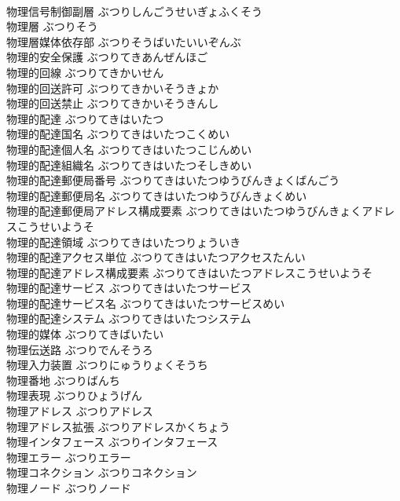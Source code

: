 \documentclass[8pt]{extreport}
\begin{document}
\begin{CJK}{UTF8}{min}
\\	物理信号制御副層	ぶつりしんごうせいぎょふくそう	
\\	物理層	ぶつりそう	
\\	物理層媒体依存部	ぶつりそうばいたいいぞんぶ	
\\	物理的安全保護	ぶつりてきあんぜんほご	
\\	物理的回線	ぶつりてきかいせん	
\\	物理的回送許可	ぶつりてきかいそうきょか	
\\	物理的回送禁止	ぶつりてきかいそうきんし	
\\	物理的配達	ぶつりてきはいたつ	
\\	物理的配達国名	ぶつりてきはいたつこくめい	
\\	物理的配達個人名	ぶつりてきはいたつこじんめい	
\\	物理的配達組織名	ぶつりてきはいたつそしきめい	
\\	物理的配達郵便局番号	ぶつりてきはいたつゆうびんきょくばんごう	
\\	物理的配達郵便局名	ぶつりてきはいたつゆうびんきょくめい	
\\	物理的配達郵便局アドレス構成要素	ぶつりてきはいたつゆうびんきょくアドレスこうせいようそ	
\\	物理的配達領域	ぶつりてきはいたつりょういき	
\\	物理的配達アクセス単位	ぶつりてきはいたつアクセスたんい	
\\	物理的配達アドレス構成要素	ぶつりてきはいたつアドレスこうせいようそ	
\\	物理的配達サービス	ぶつりてきはいたつサービス	
\\	物理的配達サービス名	ぶつりてきはいたつサービスめい	
\\	物理的配達システム	ぶつりてきはいたつシステム	
\\	物理的媒体	ぶつりてきばいたい	
\\	物理伝送路	ぶつりでんそうろ	
\\	物理入力装置	ぶつりにゅうりょくそうち	
\\	物理番地	ぶつりばんち	
\\	物理表現	ぶつりひょうげん	
\\	物理アドレス	ぶつりアドレス	
\\	物理アドレス拡張	ぶつりアドレスかくちょう	
\\	物理インタフェース	ぶつりインタフェース	
\\	物理エラー	ぶつりエラー	
\\	物理コネクション	ぶつりコネクション	
\\	物理ノード	ぶつりノード	

\end{CJK}
\end{document}
